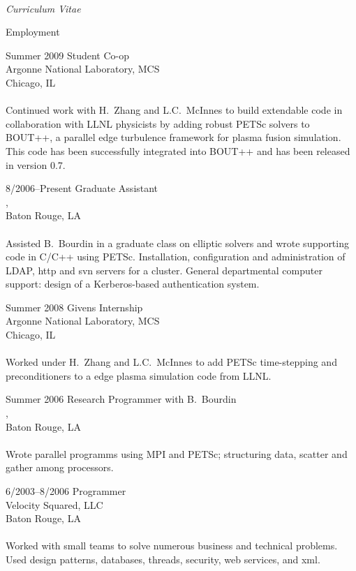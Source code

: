 \documentclass[10pt]{article}
\begin{document}
\begin{cv}{\name\\{\large \itshape Curriculum Vitae}}

\begin{cvlist}{Employment}
	\item[Summer 2009] Student Co-op\\
	Argonne National Laboratory, MCS\\
	Chicago, IL\\
	\\	
	Continued work with H.~Zhang and L.C.~McInnes to build extendable code in collaboration
	with LLNL physicists by adding robust PETSc solvers to BOUT++, a parallel edge turbulence
	framework for plasma fusion simulation. This code has been successfully integrated
	into BOUT++ and has been released in version 0.7.	 
	
	\item[8/2006--Present] Graduate Assistant\\
	\institute, \dept\\
	Baton Rouge, LA\\
	\\
	Assisted B.~Bourdin in a graduate class on elliptic solvers and wrote 
	supporting code in C/C++ using PETSc. Installation, configuration and 
	administration of LDAP, http and svn servers for a cluster. General 
	departmental computer support: design of a Kerberos-based authentication system.
	
	\pagebreak
	
	\item[Summer 2008] Givens Internship\\
	Argonne National Laboratory, MCS\\
	Chicago, IL\\
	\\
	Worked under H.~Zhang and L.C.~McInnes to add PETSc time-stepping and 
	preconditioners to a edge plasma simulation code from LLNL.
	
	\item[Summer 2006] Research Programmer with B.~Bourdin\\
	\institute, \dept\\
	Baton Rouge, LA\\
	\\
	Wrote parallel programms using MPI and PETSc; structuring data, scatter and gather among processors.
	
	\item[6/2003--8/2006] Programmer\\
	Velocity Squared, LLC\\
	Baton Rouge, LA\\
	\\
	Worked with small teams to solve numerous business and technical problems. Used design
	patterns, databases, threads, security, web services, and xml.
	

\end{cvlist}
\end{cv}
\end{document}

